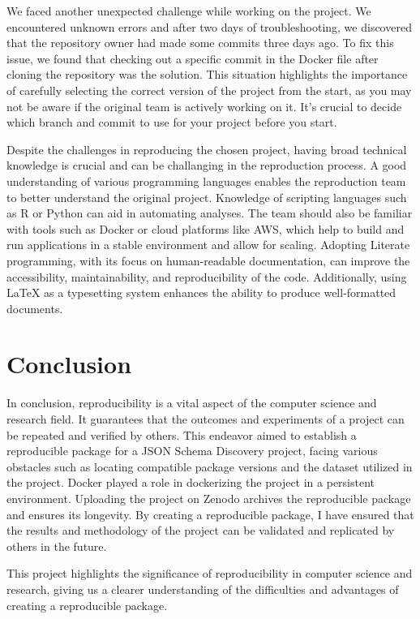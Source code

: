 \documentclass[sigconf]{acmart}
\begin{document}
We faced another unexpected challenge while working on the project. We encountered unknown errors and after two days of troubleshooting, we discovered that the repository owner had made some commits three days ago. To fix this issue, we found that checking out a specific commit in the Docker file after cloning the repository was the solution. This situation highlights the importance of carefully selecting the correct version of the project from the start, as you may not be aware if the original team is actively working on it. It's crucial to decide which branch and commit to use for your project before you start.

Despite the challenges in reproducing the chosen project, having broad technical knowledge is crucial and can be challanging in the reproduction process. A good understanding of various programming languages enables the reproduction team to better understand the original project. Knowledge of scripting languages such as R or Python can aid in automating analyses. The team should also be familiar with tools such as Docker or cloud platforms like AWS, which help to build and run applications in a stable environment and allow for scaling. Adopting Literate programming, with its focus on human-readable documentation, can improve the accessibility, maintainability, and reproducibility of the code. Additionally, using LaTeX as a typesetting system enhances the ability to produce well-formatted documents.

\section{Conclusion}

In conclusion, reproducibility is a vital aspect of the computer science and research field. It guarantees that the outcomes and experiments of a project can be repeated and verified by others. This endeavor aimed to establish a reproducible package for a JSON Schema Discovery project, facing various obstacles such as locating compatible package versions and the dataset utilized in the project.
Docker played a role in dockerizing the project in a persistent environment. Uploading the project on Zenodo archives the reproducible package and ensures its longevity.
By creating a reproducible package, I have ensured that the results and methodology of the project can be validated and replicated by others in the future.

This project highlights the significance of reproducibility in computer science and research, giving us a clearer understanding of the difficulties and advantages of creating a reproducible package.




\appendix
\end{document}
